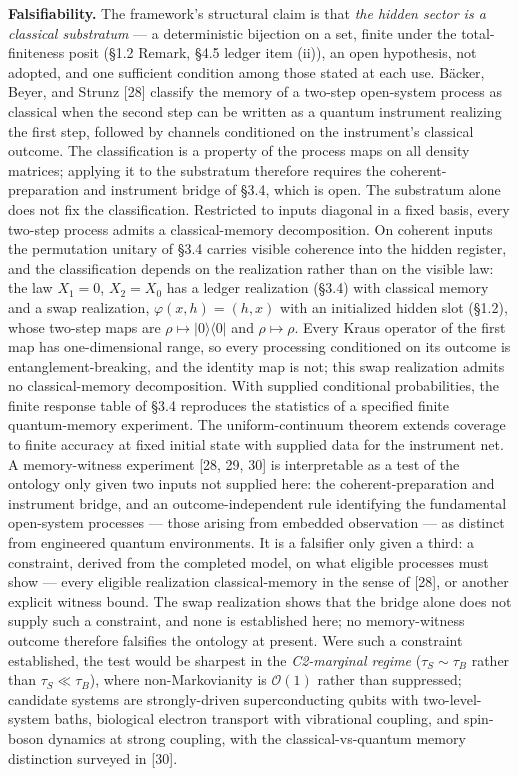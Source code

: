 \documentclass[
]{article}
\begin{document}
\textbf{Falsifiability.} The framework's structural claim is that
\emph{the hidden sector is a classical substratum} --- a deterministic
bijection on a set, finite under the total-finiteness posit (§1.2
Remark, §4.5 ledger item (ii)), an open hypothesis, not adopted, and one
sufficient condition among those stated at each use. Bäcker, Beyer, and
Strunz {[}28{]} classify the memory of a two-step open-system process as
classical when the second step can be written as a quantum instrument
realizing the first step, followed by channels conditioned on the
instrument's classical outcome. The classification is a property of the
process maps on all density matrices; applying it to the substratum
therefore requires the coherent-preparation and instrument bridge of
§3.4, which is open. The substratum alone does not fix the
classification. Restricted to inputs diagonal in a fixed basis, every
two-step process admits a classical-memory decomposition. On coherent
inputs the permutation unitary of §3.4 carries visible coherence into
the hidden register, and the classification depends on the realization
rather than on the visible law: the law \(X_1 = 0\), \(X_2 = X_0\) has a
ledger realization (§3.4) with classical memory and a swap realization,
\(\varphi(x,h) = (h,x)\) with an initialized hidden slot (§1.2), whose
two-step maps are \(\rho \mapsto |0\rangle\langle 0|\) and
\(\rho \mapsto \rho\). Every Kraus operator of the first map has
one-dimensional range, so every processing conditioned on its outcome is
entanglement-breaking, and the identity map is not; this swap
realization admits no classical-memory decomposition. With supplied
conditional probabilities, the finite response table of §3.4 reproduces
the statistics of a specified finite quantum-memory experiment. The
uniform-continuum theorem extends coverage to finite accuracy at fixed
initial state with supplied data for the instrument net. A
memory-witness experiment {[}28, 29, 30{]} is interpretable as a test of
the ontology only given two inputs not supplied here: the
coherent-preparation and instrument bridge, and an outcome-independent
rule identifying the fundamental open-system processes --- those arising
from embedded observation --- as distinct from engineered quantum
environments. It is a falsifier only given a third: a constraint,
derived from the completed model, on what eligible processes must show
--- every eligible realization classical-memory in the sense of
{[}28{]}, or another explicit witness bound. The swap realization shows
that the bridge alone does not supply such a constraint, and none is
established here; no memory-witness outcome therefore falsifies the
ontology at present. Were such a constraint established, the test would
be sharpest in the \emph{C2-marginal regime} (\(\tau_S \sim \tau_B\)
rather than \(\tau_S \ll \tau_B\)), where non-Markovianity is
\(\mathcal{O}(1)\) rather than suppressed; candidate systems are
strongly-driven superconducting qubits with two-level-system baths,
biological electron transport with vibrational coupling, and spin-boson
dynamics at strong coupling, with the classical-vs-quantum memory
distinction surveyed in {[}30{]}.
\end{document}
